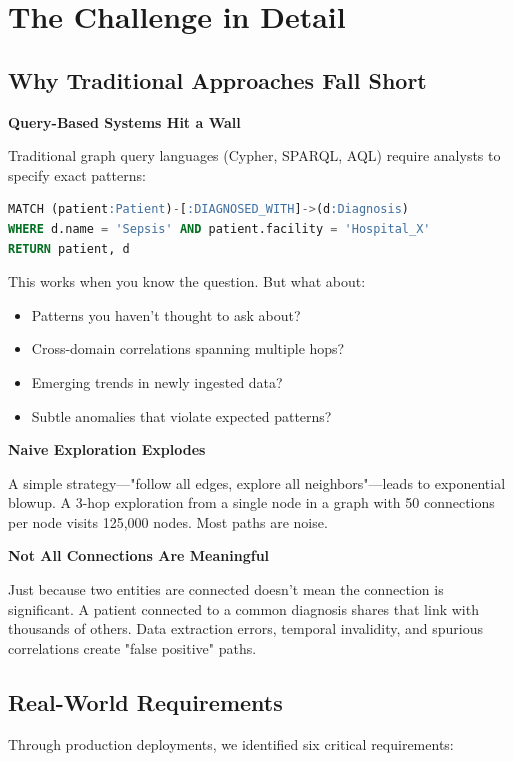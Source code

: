 \documentclass[11pt]{article}
\begin{document}
\section{The Challenge in Detail}

\subsection{Why Traditional Approaches Fall Short}

\textbf{Query-Based Systems Hit a Wall}

Traditional graph query languages (Cypher, SPARQL, AQL) require analysts to specify exact patterns:

\begin{lstlisting}[language=SQL]
MATCH (patient:Patient)-[:DIAGNOSED_WITH]->(d:Diagnosis)
WHERE d.name = 'Sepsis' AND patient.facility = 'Hospital_X'
RETURN patient, d
\end{lstlisting}

This works when you know the question. But what about:
\begin{itemize}
\item Patterns you haven't thought to ask about?
\item Cross-domain correlations spanning multiple hops?
\item Emerging trends in newly ingested data?
\item Subtle anomalies that violate expected patterns?
\end{itemize}

\textbf{Naive Exploration Explodes}

A simple strategy—"follow all edges, explore all neighbors"—leads to exponential blowup. A 3-hop exploration from a single node in a graph with 50 connections per node visits 125,000 nodes. Most paths are noise.

\textbf{Not All Connections Are Meaningful}

Just because two entities are connected doesn't mean the connection is significant. A patient connected to a common diagnosis shares that link with thousands of others. Data extraction errors, temporal invalidity, and spurious correlations create "false positive" paths.

\subsection{Real-World Requirements}

Through production deployments, we identified six critical requirements:
\end{document}
